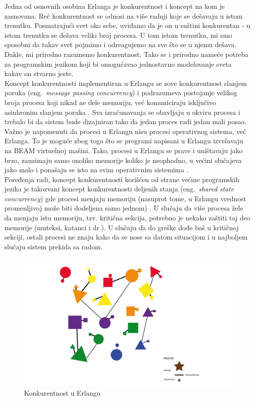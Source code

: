 \documentclass[a4paper]{article}
\begin{document}
{Jedna od osnovnih osobina Erlanga je konkurentnost i koncept na kom je zasnovana.
Reč konkurentnost se odnosi na više radnji koje se dešavaju u istom trenutku. Posmatrajući svet oko
sebe, uviđamo da je on u suštini konkurentan - u istom trenutku se dešava veliki broj procesa. \cite{phdthesis}
U tom istom trenutku, mi smo sposobni da takav svet pojmimo i odreagujemo na sve što se u njemu dešava. Dakle, mi prirodno razumemo konkurentnost.
Tako se i prirodno nameće potreba za programskim jezikom koji bi omogućavao jednostavno modelovanje sveta kakav on stvarno jeste. \\

Koncept konkurentnosti implementiran u Erlangu se zove konkurentnost slanjem poruka (eng.~{\em message passing concurrency})
i podrazumeva postojanje velikog broja procesa koji nikad ne dele memoriju, već komuniciraju isključivo asinhronim slanjem poruka \cite{book_joe}.
Sva izračunavanja se obavljaju u okviru procesa i trebalo bi da sistem bude dizajniran tako da jedan proces radi jedan mali posao.
Važno je napomenuti da procesi u Erlangu nisu procesi operativnog sistema, već Erlanga.
To je moguće zbog toga što se programi napisani u Erlangu izvršavaju na BEAM virtuelnoj mašini.
Tako, procesi u Erlangu se prave i uništavaju jako brzo, zauzimaju samo onoliko memorije koliko je neophodno, u većini slučajeva jako malo
i ponašaju se isto na svim operativnim sistemima \cite{book_joe}.
\\

Poređenja radi, koncept konkurentnosti korišćen od strane većine programskih jezika je takozvani 
koncept konkurentnosti deljenih stanja (eng.~{\em shared state concurrency}) gde procesi 
menjaju memoriju (nasuprot tome, u Erlangu vrednost promenljivoj može biti dodeljena samo jednom) \cite{book_joe}. 
U slučaju da više procesa žele da menjaju istu memoriju, tzv. kritična sekcija, potrebno je 
nekako zaštiti taj deo memorije (muteksi, katanci i dr.). U slučaju da do greške dođe baš u kritičnoj sekciji,
ostali procesi ne znaju kako da se nose sa datom situacijom i u najboljem slučaju sistem prekida sa radom. \\

\begin{figure}[h!]
\begin{center}
\includegraphics[scale=0.5]{actor_model.png}
\end{center}
\caption{Konkurentnost u Erlangu}
\label{fig:actor_model}
\end{figure} 

}
\end{document}
